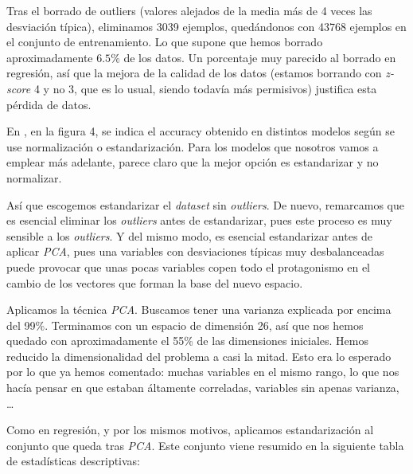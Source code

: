 \documentclass[11pt]{article}
\begin{document}
Tras el borrado de outliers (valores alejados de la media más de 4 veces las desviación típica), eliminamos 3039 ejemplos, quedándonos con 43768 ejemplos en el conjunto de entrenamiento. Lo que supone que hemos borrado aproximadamente $6.5\%$ de los datos. Un porcentaje muy parecido al borrado en regresión, así que la mejora de la calidad de los datos (estamos borrando con \emph{z-score} 4 y no 3, que es lo usual, siendo todavía más permisivos) justifica esta pérdida de datos.

En \cite{paper_clasificacion_1:paper}, en la figura 4, se indica el accuracy obtenido en distintos modelos según se use normalización o estandarización. Para los modelos que nosotros vamos a emplear más adelante, parece claro que la mejor opción es estandarizar y no normalizar.

Así que escogemos estandarizar el \emph{dataset} sin \emph{outliers}. De nuevo, remarcamos que es esencial eliminar los \emph{outliers} antes de estandarizar, pues este proceso es muy sensible a los \emph{outliers}. Y del mismo modo, es esencial estandarizar antes de aplicar \emph{PCA}, pues una variables con desviaciones típicas muy desbalanceadas puede provocar que unas pocas variables copen todo el protagonismo en el cambio de los vectores que forman la base del nuevo espacio.

Aplicamos la técnica \emph{PCA}. Buscamos tener una varianza explicada por encima del 99\%. Terminamos con un espacio de dimensión 26, así que nos hemos quedado con aproximadamente el 55\% de las dimensiones iniciales. Hemos reducido la dimensionalidad del problema a casi la mitad. Esto era lo esperado por lo que ya hemos comentado: muchas variables en el mismo rango, lo que nos hacía pensar en que estaban áltamente correladas, variables sin apenas varianza, \ldots

Como en regresión, y por los mismos motivos, aplicamos estandarización al conjunto que queda tras \emph{PCA}. Este conjunto viene resumido en la siguiente tabla de estadísticas descriptivas:
\end{document}
